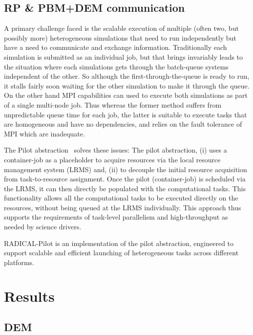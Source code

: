 \documentclass[preprint,11pt,authoryear]{elsarticle}
\begin{document}
\subsection{RP \& PBM+DEM communication}


A primary challenge faced is the scalable execution of multiple (often two,
but possibly more) heterogeneous simulations that need to run independently
but have a need to communicate and exchange information. Traditionally each
simulation is submitted as an individual job, but that brings invariably leads
to the situation where each simulations gets through the batch-queue systems
independent of the other. So although the first-through-the-queue is ready to
run, it stalls fairly soon waiting for the other simulation to make it through
the queue.  On the other hand MPI capabilities can used to  execute both
simulations as part of a single multi-node job.  Thus whereas the former
method suffers from unpredictable queue time for each job, the latter is
suitable to execute tasks that are homogeneous and have no dependencies, and
relies on the fault tolerance of MPI which are inadequate.


The Pilot abstraction~\cite{review_pilotreview} solves these issues:  The
pilot abstraction, (i) uses a container-job as a placeholder to acquire
resources via the local resource management system (LRMS) and,  (ii) to
decouple the initial resource acquisition from task-to-resource assignment.
Once the pilot (container-job) is scheduled via the LRMS, it can then directly
be populated with the computational tasks. This functionality allows all the
computational tasks to be executed directly on the resources, without being
queued at the LRMS individually. This approach thus supports the requirements
of task-level parallelism and high-throughput as needed by science drivers.

RADICAL-Pilot is an implementation of the pilot abstraction, engineered to
support scalable and efficient launching of heterogeneous tasks
across different platforms.



\section{Results}
\label{sec:Results}
\subsection{DEM}
\end{document}
